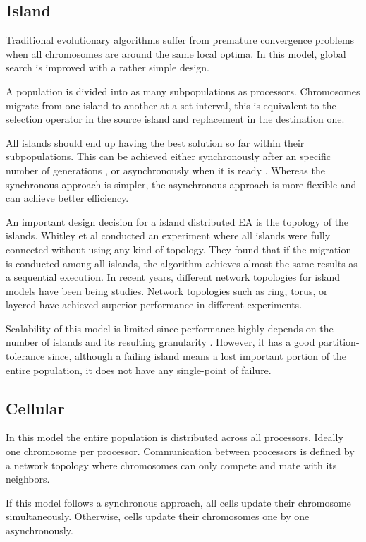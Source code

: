 \subsection{Island}

Traditional evolutionary algorithms suffer from premature convergence problems when all chromosomes are around the same local optima. In this model, global search is improved with a rather simple design.

A population is divided into as many subpopulations as processors. Chromosomes migrate from one island to another at a set interval, this is equivalent to the selection operator in the source island and replacement in the destination one.

All islands should end up having the best solution so far within their subpopulations. This can be achieved either synchronously after an specific number of generations \cite{89}, or asynchronously when it is ready \cite{30}. Whereas the synchronous approach is simpler, the asynchronous approach is more flexible and can achieve better efficiency.

An important design decision for a island distributed EA is the topology of the islands. Whitley et al \cite{140} conducted an experiment where all islands were fully connected without using any kind of topology. They found that if the migration is conducted among all islands, the algorithm achieves almost the same results as a sequential execution. In recent years, different network topologies for island models have been being studies. Network topologies such as ring, torus, or layered have achieved superior performance in different experiments. \cite{62}

Scalability of this model is limited since performance highly depends on the number of islands and its resulting granularity \cite{58}. However, it has a good partition-tolerance since, although a failing island means a lost important portion of the entire population, it does not have any single-point of failure.

\subsection{Cellular}
In this model the entire population is distributed across all processors. Ideally one chromosome per processor. Communication between processors is defined by a network topology where chromosomes can only compete and mate with its neighbors.

If this model follows a synchronous approach, all cells update their chromosome simultaneously. Otherwise, cells update their chromosomes one by one asynchronously.

